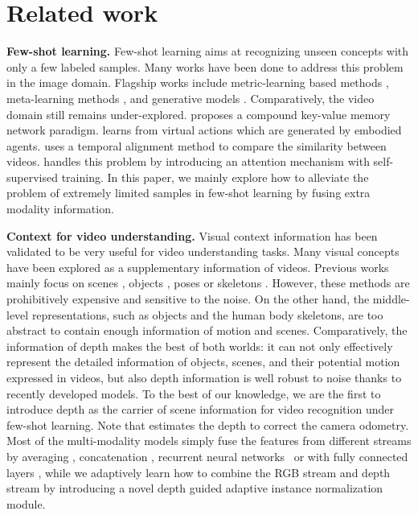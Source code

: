 \documentclass[sigconf]{acmart}
\begin{document}
	
	
	
\section{Related work}
	
	\noindent \textbf{Few-shot learning.}
	Few-shot learning aims at recognizing unseen concepts with only a few labeled samples. 
	Many works have been done to address this problem in the image domain. 
	Flagship works include metric-learning based methods \cite{snell2017prototypical,matchingnet_1shot,liu2020embarrassingly,sung2017learning,zhang2017learning},
	meta-learning methods \cite{finn2017model, wang2017learning, wang2016learningto}, 
	and generative models \cite{Lake_oneshot, miller2000oneshot_transforms,wang2018low}. 
	Comparatively, the video domain still remains under-explored.  \cite{zhu2018compound} proposes a compound key-value memory network paradigm. 
	\cite{fu2019embodied} learns from virtual actions which are generated by embodied agents. 
	\cite{cao2019few} uses a temporal alignment method to compare the similarity between videos. 
	\cite{zhang2020few} handles this problem by introducing an attention mechanism with self-supervised training.
	In this paper, we mainly explore how to alleviate the problem of extremely limited samples in few-shot learning by fusing extra modality information. 
	
	
	\noindent \textbf{Context for video understanding.} 
	Visual context information has been validated to be very useful for video understanding tasks. Many visual concepts have been explored as a supplementary information of videos. 
	Previous works mainly focus on scenes \cite{li2007and, marszalek2009actions, cvpr16OSS}, 
	objects \cite{gupta2007objects, ikizler2010object, jain201515, wu2007scalable, wang2018videos}, 
	poses or skeletons \cite{jiang2015informative, wang2013approach, yang2010recognizing, yan2019pa3d,yan2018spatial}. 
	However, these methods are prohibitively expensive and sensitive to the noise.
	On the other hand, the middle-level representations, such as objects and the human body skeletons, are too abstract to contain enough information of motion and scenes. 
	Comparatively, the information of depth makes the best of both worlds: it can not only effectively represent the detailed information of objects, scenes, and their potential motion expressed in videos, but also depth information is well robust to noise thanks to recently developed models. 
	To the best of our knowledge, we are the first to introduce depth as the carrier of scene information for video recognition under few-shot learning. 
	Note that \cite{boukhers2018example} estimates the depth to correct the camera odometry.
	Most of the multi-modality models simply fuse the features from different streams by averaging \cite{simonyan2014two}, concatenation \cite{wang2018videos}, recurrent neural networks~\cite{zhang2017actor} or with fully connected layers \cite{ijcai18:face}, while we adaptively learn how to combine the RGB stream and depth stream by introducing a novel depth guided adaptive instance normalization module. 
	
\end{document}
